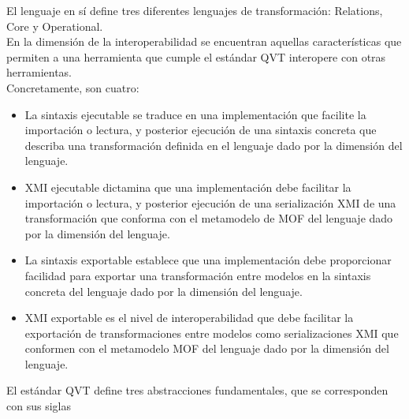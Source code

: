{El lenguaje en sí define tres diferentes lenguajes de transformación: Relations, Core y Operational.\\

En la dimensión de la interoperabilidad se encuentran aquellas características que permiten a una herramienta que cumple el estándar QVT interopere con otras herramientas.\\
Concretamente, son cuatro:

\begin{itemize}
	\item La sintaxis ejecutable se traduce en una implementación que facilite la importación o lectura, y posterior ejecución de una sintaxis concreta que describa una transformación definida en el lenguaje dado por la dimensión del lenguaje.	 	 	 	
	\item XMI ejecutable dictamina que una implementación debe facilitar la importación o lectura, y posterior ejecución de una serialización XMI de una transformación que conforma con el metamodelo de MOF del lenguaje dado por la dimensión del lenguaje. 	
	\item La sintaxis exportable establece que una implementación debe proporcionar facilidad para exportar una transformación entre modelos en la sintaxis concreta del lenguaje dado por la dimensión del lenguaje. 	 	 	
	\item XMI exportable es el nivel de interoperabilidad que debe facilitar la exportación de transformaciones entre modelos como serializaciones XMI que conformen con el metamodelo MOF del lenguaje dado por la dimensión del lenguaje.
\end{itemize}

El estándar QVT define tres abstracciones fundamentales, que se corresponden con sus siglas

}
